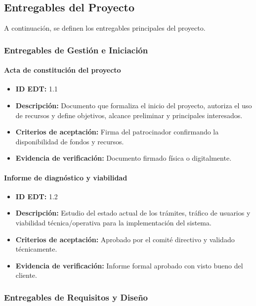 \subsection{Entregables del Proyecto}
\label{sec:Entregables del producto}
A continuación, se definen los entregables principales del proyecto. 

\subsubsection{Entregables de Gestión e Iniciación}

\paragraph{Acta de constitución del proyecto}
\begin{itemize}
    \item \textbf{ID EDT:} 1.1
    \item \textbf{Descripción:} Documento que formaliza el inicio del proyecto, autoriza el uso de recursos y define objetivos, alcance preliminar y principales interesados.
    \item \textbf{Criterios de aceptación:} Firma del patrocinador confirmando la disponibilidad de fondos y recursos.
    \item \textbf{Evidencia de verificación:} Documento firmado física o digitalmente.
\end{itemize}

\paragraph{Informe de diagnóstico y viabilidad}
\begin{itemize}
    \item \textbf{ID EDT:} 1.2
    \item \textbf{Descripción:} Estudio del estado actual de los trámites, tráfico de usuarios y viabilidad técnica/operativa para la implementación del sistema.
    \item \textbf{Criterios de aceptación:} Aprobado por el comité directivo y validado técnicamente.
    \item \textbf{Evidencia de verificación:} Informe formal aprobado con visto bueno del cliente.
\end{itemize}

\subsubsection{Entregables de Requisitos y Diseño}

